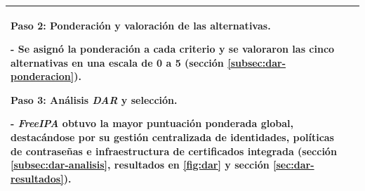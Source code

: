 \begin{table}[htbp]
\begin{tabular}{|>{\raggedright\arraybackslash}p{}|>{\raggedright\arraybackslash}p{}|}
		\textbf{Paso 2: Ponderación y valoración de las alternativas.}\par\vspace{0.4em}
		- Se asignó la ponderación a cada criterio y se valoraron las cinco alternativas en una escala de 0 a 5 (sección \textcolor[HTML]{1B6B93}{\ref{subsec:dar-ponderacion}}).\par\vspace{0.6em}
		\textbf{Paso 3: Análisis \textit{\textcolor[HTML]{1B6B93}{DAR}} y selección.}\par\vspace{0.4em}
		- \textit{FreeIPA} obtuvo la mayor puntuación ponderada global, destacándose por su gestión centralizada de identidades, políticas de contraseñas e infraestructura de certificados integrada (sección \textcolor[HTML]{1B6B93}{\ref{subsec:dar-analisis}}, resultados en \autoref{fig:dar} y sección \textcolor[HTML]{1B6B93}{\ref{sec:dar-resultados}}).                                                                                                     \\
		\hline
	\end{tabular}
\end{table}
